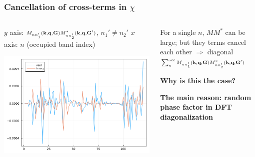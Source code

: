 \documentclass[t,aspectratio=169]{beamer}
\begin{document}
\begin{frame}
\frametitle{Cancellation of cross-terms in $\chi$}

\begin{columns}
    
\begin{column}{0.6\textwidth}
    $y$ axis: $\scriptstyle M_{n n'_1} (\vb{k}, \vb{q}, \vb{G}) M^*_{nn'_2} (\vb{k}, \vb{q}, \vb{G}')$, $n_1' \neq n_2'$
    $x$ axis: $n$ (occupied band index) 
    \begin{center}
        \includegraphics[width=\textwidth]{../data/chi/nc-n1-2000-n2-1000-nv-1-120-k_idx-12-q_idx-37-G_idx-200.png}
    \end{center}    
\end{column}

\begin{column}{0.4\textwidth}
    \faHandPointRight For a single $n$, $MM^*$ can be large;
    but they terms cancel each other $\Rightarrow$
    diagonal $\scriptstyle \sum_{n}^{\text{occ}} M_{n n'_1} (\vb{k}, \vb{q}, \vb{G}) M^*_{nn'_2} (\vb{k}, \vb{q}, \vb{G}')$
    
    \textbf{Why is this the case?}    
    
    \vspace{1cm}
    
    \faHandPointRight \textbf{The main reason: random phase factor in DFT diagonalization}
\end{column}

\end{columns}

\end{frame}
\end{document}
